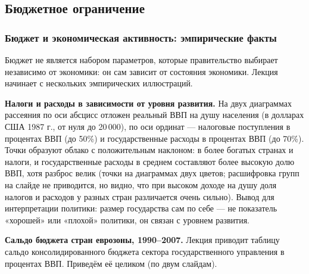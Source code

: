\documentclass[11pt,a4paper]{article}
\begin{document}
\subsection{Бюджетное ограничение}

\subsubsection{Бюджет и экономическая активность: эмпирические факты}

Бюджет не является набором параметров, которые правительство выбирает независимо от экономики: он сам зависит от состояния экономики. Лекция начинает с нескольких эмпирических иллюстраций.

\textbf{Налоги и расходы в зависимости от уровня развития.} На двух диаграммах рассеяния по оси абсцисс отложен реальный ВВП на душу населения (в долларах США 1987 г., от нуля до 20\,000), по оси ординат --- налоговые поступления в процентах ВВП (до 50\%) и государственные расходы в процентах ВВП (до 70\%). Точки образуют облако с положительным наклоном: в более богатых странах и налоги, и государственные расходы в среднем составляют более высокую долю ВВП, хотя разброс велик (точки на диаграммах двух цветов; расшифровка групп на слайде не приводится, но видно, что при высоком доходе на душу доля налогов и расходов у разных стран различается очень сильно). Вывод для интерпретации политики: размер государства сам по себе --- не показатель «хорошей» или «плохой» политики, он связан с уровнем развития.

\textbf{Сальдо бюджета стран еврозоны, 1990--2007.} Лекция приводит таблицу сальдо консолидированного бюджета сектора государственного управления в процентах ВВП. Приведём её целиком (по двум слайдам).
\end{document}
